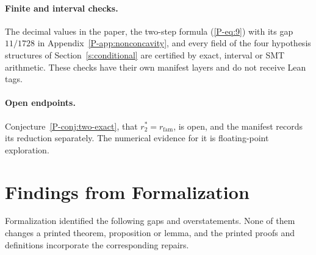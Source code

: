 \documentclass[11pt]{article}
\newcommand{\pref}[1]{\ref*{P-#1}}
\newcommand{\peqref}[1]{(\ref*{P-#1})}
\begin{document}
\paragraph{Finite and interval checks.}
The decimal values in the paper, the two-step formula \peqref{eq:9} with
its gap $11/1728$ in Appendix~\pref{app:nonconcavity}, and every field of
the four hypothesis structures of Section~\ref{s:conditional} are
certified by exact, interval or SMT arithmetic. These checks have their
own manifest layers and do not receive Lean tags.

\paragraph{Open endpoints.}
Conjecture~\pref{conj:two-exact}, that $r_2^*=r_{\mathrm{fam}}$, is open,
and the manifest records its reduction separately. The numerical evidence
for it is floating-point exploration.

\section{Findings from Formalization}

Formalization identified the following gaps and overstatements. None of
them changes a printed theorem, proposition or lemma, and the printed
proofs and definitions incorporate the corresponding repairs.
\end{document}
